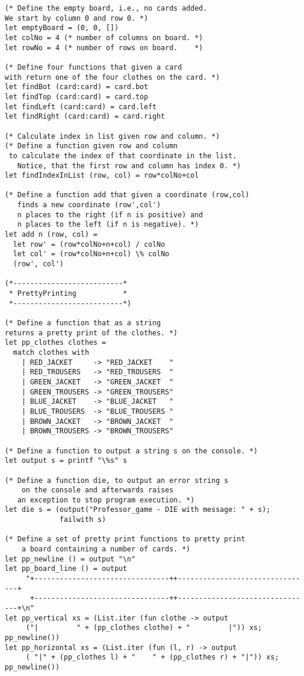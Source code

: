 \begin{lstlisting}
(* Define the empty board, i.e., no cards added. 
We start by column 0 and row 0. *)
let emptyBoard = (0, 0, [])
let colNo = 4 (* number of columns on board. *)
let rowNo = 4 (* number of rows on board.    *)

(* Define four functions that given a card 
with return one of the four clothes on the card. *)
let findBot (card:card) = card.bot
let findTop (card:card) = card.top
let findLeft (card:card) = card.left
let findRight (card:card) = card.right

(* Calculate index in list given row and column. *)
(* Define a function given row and column
 to calculate the index of that coordinate in the list. 
   Notice, that the first row and column has index 0. *)
let findIndexInList (row, col) = row*colNo+col

(* Define a function add that given a coordinate (row,col) 
   finds a new coordinate (row',col') 
   n places to the right (if n is positive) and 
   n places to the left (if n is negative). *)
let add n (row, col) =
  let row' = (row*colNo+n+col) / colNo
  let col' = (row*colNo+n+col) \% colNo
  (row', col')

(*--------------------------*
 * PrettyPrinting           *
 *--------------------------*)

(* Define a function that as a string 
returns a pretty print of the clothes. *)
let pp_clothes clothes =
  match clothes with
    | RED_JACKET     -> "RED_JACKET    "
    | RED_TROUSERS   -> "RED_TROUSERS  "
    | GREEN_JACKET   -> "GREEN_JACKET  "
    | GREEN_TROUSERS -> "GREEN_TROUSERS"
    | BLUE_JACKET    -> "BLUE_JACKET   "
    | BLUE_TROUSERS  -> "BLUE_TROUSERS "
    | BROWN_JACKET   -> "BROWN_JACKET  "
    | BROWN_TROUSERS -> "BROWN_TROUSERS"

(* Define a function to output a string s on the console. *)
let output s = printf "\%s" s

(* Define a function die, to output an error string s 
    on the console and afterwards raises
   an exception to stop program execution. *)
let die s = (output("Professor_game - DIE with message: " + s);
             failwith s)

(* Define a set of pretty print functions to pretty print 
    a board containing a number of cards. *)
let pp_newline () = output "\n"
let pp_board_line () = output
     "+--------------------------------++--------------------------------+
      +--------------------------------++--------------------------------+\n"
let pp_vertical xs = (List.iter (fun clothe -> output
     ("|         " + (pp_clothes clothe) + "         |")) xs; pp_newline())
let pp_horizontal xs = (List.iter (fun (l, r) -> output
     ( "|" + (pp_clothes l) + "    " + (pp_clothes r) + "|")) xs; pp_newline())


\end{lstlisting}
